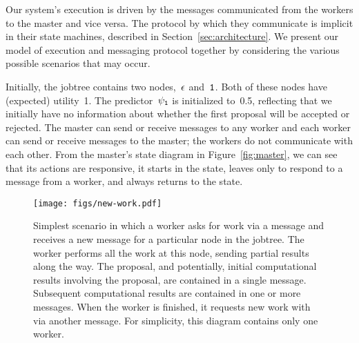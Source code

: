 \documentclass[angelino.tex]{subfiles}
\begin{document}
Our system's execution is driven by the messages communicated from the workers
to the master and vice versa.
%
The protocol by which they communicate is implicit in their state machines,
described in Section~\ref{sec:architecture}.
%
We present our model of execution and messaging protocol together
by considering the various possible scenarios that may occur.

%

Initially, the jobtree contains two nodes,~$\epsilon$ and~$\texttt{1}$.
%
Both of these nodes have (expected) utility~1.
%
The predictor~$\psi_{\texttt{1}}$ is initialized to~0.5, reflecting that we
initially have no information about whether the first proposal will be accepted
or rejected.
%
The master can send or receive messages to any worker
and each worker can send or receive messages to the master;
the workers do not communicate with each other.
%
From the master's state diagram in Figure~\ref{fig:master}, we can see that its
actions are responsive, \ie it starts in the \wait state, leaves only to
respond to a message from a worker, and always returns to the \wait state.


\begin{figure}[t]
\centering
\texttt{[image: figs/new-work.pdf]}
\caption{Simplest scenario in which a worker asks for work via a \WANTWORK
message and receives a new \HAVEWORK message for a particular node in the jobtree.
The worker performs all the work at this node, sending partial results along the way.
The proposal, and potentially, initial computational results involving the proposal,
are contained in a single \SETPROPOSAL message.
Subsequent computational results are contained in one or more \UPDATE messages.
When the worker is finished, it requests new work with via another \WANTWORK message.
For simplicity, this diagram contains only one worker.}
\label{fig:new-work}
\end{figure}
\end{document}
